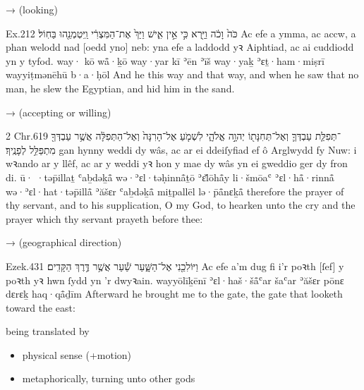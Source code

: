 \begin{frame}{\exwref {} →  (looking)}
	\exstep
	\begin{example}{Ex.}{2}{12}{}{}
		\quoling
		{ כֹּה֙ וָכֹ֔ה וַיַּ֖רְא כִּ֣י אֵ֣ין אִ֑ישׁ וַיַּךְ֙ אֶת־הַמִּצְרִ֔י וַֽיִּטְמְנֵ֖הוּ בַּחֽוֹל׃}
		{Ac efe a  ymma, ac accw, a phan welodd nad [oedd yno] neb: yna efe a laddodd yꝛ Aiphtiad, ac ai cuddiodd yn y tyfod.}
		{way· kō wå̄·ḵō way·yar kī ʾēn ʾīš way·yaḵ ʾɛṯ·ham·miṣrī wayyiṭmənēhū b·a·ḥōl}
		{And he  this way and that way, and when he saw that  no man, he slew the Egyptian, and hid him in the sand.}
	\end{example}
\end{frame}


\begin{frame}{\exwref {} →  (accepting or willing)}
	\exstep
	\begin{example}{2 Chr.}{6}{19}{}{}
		\quoling
		{ ־תְּפִלַּ֧ת עַבְדְּךָ֛ וְאֶל־תְּחִנָּת֖וֹ יְהוָ֣ה אֱלֹהָ֑י לִשְׁמֹ֤עַ אֶל־הָרִנָּה֙ וְאֶל־הַתְּפִלָּ֔ה אֲשֶׁ֥ר עַבְדְּךָ֖ מִתְפַּלֵּ֥ל לְפָנֶֽיךָ׃}
		{ gan hynny  weddi dy wâs, ac ar ei ddeiſyfiad ef ô Arglwydd fy Nuw: i wꝛando ar y llêf, ac ar y weddi yꝛ hon y mae dy wâs yn ei gweddio ger dy fron di.}
		{ū· ·təp̄illaṯ ʿaḇdəḵå̄ wə·ʾɛl·təḥinnå̄ṯō {\YHWH} ʾɛ̆lōhå̄y li·šmōaʿ ʾɛl·hå̄·rinnå̄ wə·ʾɛl·hat·təp̄illå̄ ʾăšɛr ʿaḇdəḵå̄ miṯpallēl lə·p̄å̄nɛḵå̄}
		{ therefore  the prayer of thy servant, and to his supplication, O {\LORD} my God, to hearken unto the cry and the prayer which thy servant prayeth before thee:}
	\end{example}
\end{frame}


\begin{frame}{\exwref {} →  (geographical direction)}
	\exstep
	\begin{example}{Ezek.}{43}{1}{}{}
		\quoling
		{וַיּוֹלִכֵ֖נִי אֶל־הַשָּׁ֑עַר שַׁ֕עַר אֲשֶׁ֥ר  דֶּ֥רֶךְ הַקָּדִֽים׃}
		{Ac efe a’m dug fi i’r poꝛth [ſef] y poꝛth yꝛ hwn ſydd yn   ’r dwyꝛain.}
		{wayyōlīḵēnī ʾɛl·haš·šå̄ʿar šaʿar ʾăšɛr pōnɛ dɛrɛḵ haq·qå̄ḏīm}
		{Afterward he brought me to the gate,  the gate that looketh toward the east:}
	\end{example}
\end{frame}


\begin{frame}{ being translated by }
	\begin{itemize}
		\item physical sense (+motion)\hfill{}
		\item metaphorically, turning unto other gods\hfill{}
	\end{itemize}
\end{frame}


